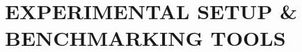 \documentclass[letterpaper,conference]{IEEEtran}
\begin{document}







\section{EXPERIMENTAL SETUP \& BENCHMARKING TOOLS}\label{expsetup}
\end{document}
